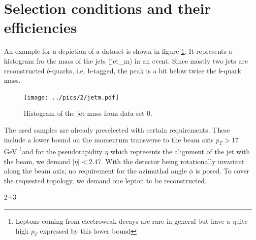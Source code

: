 \FloatBarrier
\section{Selection conditions and their efficiencies}
An example for a depiction of a dataset is shown in figure \ref{pic:examplePlot}. It represents a histogram fro the mass of the jets (jet\_m) in an
event. Since mostly two jets are reconstructed $b$-quarks, i.e. b-tagged, the peak is a bit below twice the $b$-quark mass. 
\begin{figure}[t]
 \texttt{[image: ../pics/2/jetm.pdf]}
 \caption{Histogram of the jet mass from data set 0.}
 \label{pic:examplePlot}
\end{figure}
The used samples are already preselected with certain requirements. These include a lower bound on the momentum transverse to the beam axis $p_T>17$ GeV 
\footnote[1]{Leptons coming from electroweak
decays are rare in general but have a quite high $p_T$ expressed by this lower bound}and
for the pseudorapidity $\eta$ which represents the alignment of the jet with the beam, we demand $|\eta| < 2.47$. With the detector being rotationally
invariant along the beam axis, no requirement for the azimuthal angle $\phi$ is posed. To cover the requested topology, we demand 
one lepton to be reconstructed. 

2+3
	

